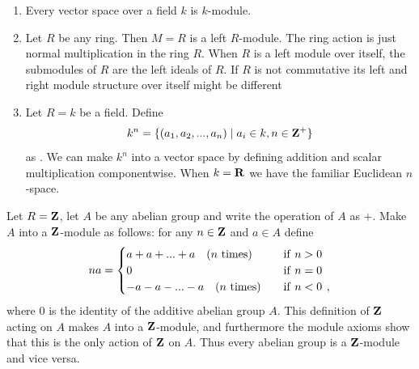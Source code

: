     \begin{example}
        \phantom{a}
        \begin{enumerate}[label = (\arabic*)]
            \item Every vector space over a field $k$ is $k$-module.
            \item Let $R$ be any ring. Then $M = R$ is a left $R$-module. The ring action is just normal multiplication in the ring $R$. When $R$ is a left module over itself, the submodules of $R$ are the left ideals of $R$. If $R$ is not commutative its left and right module structure over itself might be different
            \item Let $R = k$ be a field. Define
                \begin{equation*}
                \begin{split}
                k^n = \{(a_1,a_2,...,a_n) \mid a_i \in k, n \in \mathbf{Z}^{+}\}
                \end{split}
                \end{equation*}
            as . We can make $k^n$ into a vector space by defining addition and scalar multiplication componentwise. When $k = \mathbf{R}$ we have the familiar Euclidean $n$-space.
        \end{enumerate}
    \end{example}

    \begin{example}
        Let $R = \mathbf{Z}$, let $A$ be any abelian group and write the operation of $A$ as $+$. Make $A$ into a $\mathbf{Z}$-module as follows: for any $n \in \mathbf{Z}$ and $a \in A$ define
        \begin{equation*}
        na = 
        \begin{cases} 
        a + a + ... + a \text{\quad ($n$ times)} & \quad \text{if}\hskip0.4em\relax n>0 \\
        0 & \quad \text{if}\hskip0.4em\relax n=0 \\
        -a - a - ... - a \text{\quad ($n$ times)} & \quad \text{if}\hskip0.4em\relax n<0\hskip0.4em\relax, 
        \end{cases}
        \end{equation*}
        where $0$ is the identity of the additive abelian group $A$. This definition of $\mathbf{Z}$ acting on $A$ makes $A$ into a $\mathbf{Z}$-module, and furthermore the module axioms show that this is the only action of $\mathbf{Z}$ on $A$. Thus every abelian group is a $\mathbf{Z}$-module and vice versa.
    \end{example}

